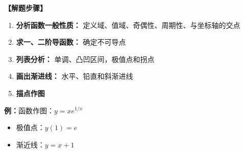 \begin{shaded}
{\bf 【解题步骤】}
\begin{enumerate}[(1)]
  \setlength{\itemindent}{1cm}
  \item {\bf 分析函数一般性质：}{ 定义域、值域、奇偶性、周期性、与坐标轴的交点}
  \item {\bf 求一、二阶导函数：}{ 确定不可导点}
  \item {\bf 列表分析：}{ 单调、凸凹区间，极值点和拐点}
  \item {\bf 画出渐进线：}{ 水平、铅直和斜渐进线}
  \item {\bf 描点作图}
\end{enumerate}
\end{shaded}

{\bf 例：}函数作图：$y=xe^{1/x}$
\begin{itemize}
  \setlength{\itemindent}{1cm}
  \item 极值点：$y(1)=e$
  \item 渐近线：$y=x+1$
\end{itemize}

\begin{center}
\end{center}

